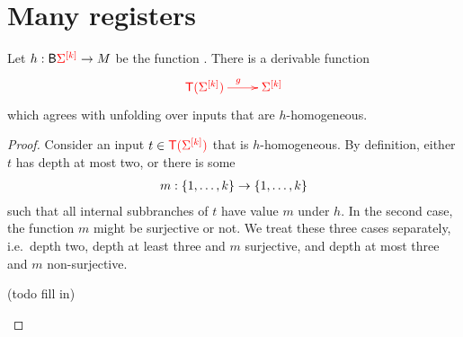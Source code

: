 \section{Many registers}



\begin{lemma}\label{lem:homo-unfold}
    Let $h : \mathsf{B} {\color{red}{\Sigma^{[k]}}} \to M$ be the function .
    There is a derivable function 
\begin{align*}
    \ranked{
        \xymatrix{
              \tmonad (\rSigma^{[k]})  \ar[r]^{g} & \rSigma^{[k]} 
        }
    }
\end{align*}
which agrees with unfolding over inputs that are $h$-homogeneous.
\end{lemma}
\begin{proof} Consider an input $t \in {\color{red}{{\color{red}{\mathsf T}}(\Sigma^{[k]})}}$ that is $h$-homogeneous. By definition, either $t$ has depth at most two, or there is some 
    \begin{align*}
        m : \{1,\ldots,k\} \to \{1,\ldots,k\}
    \end{align*}
    such that all internal subbranches of $t$ have value $m$ under $h$. In the second case, the function $m$ might be surjective or not. We treat these three cases separately, i.e.~depth two, depth at least three  and $m$ surjective, and depth at most three and $m$ non-surjective.
    \begin{center}
        (todo fill in)
    \end{center}
\end{proof}





